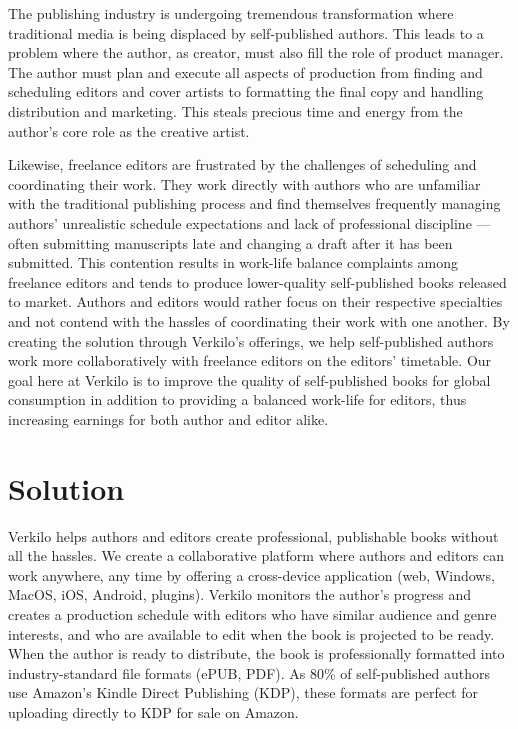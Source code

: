 \documentclass[10pt,openany]{book}
\begin{document}
The publishing industry is undergoing tremendous transformation where
traditional media is being displaced by self-published authors. This
leads to a problem where the author, as creator, must also fill the role
of product manager. The author must plan and execute all aspects of
production from finding and scheduling editors and cover artists to
formatting the final copy and handling distribution and marketing. This
steals precious time and energy from the author's core role as the
creative artist.

Likewise, freelance editors are frustrated by the challenges of
scheduling and coordinating their work. They work directly with authors
who are unfamiliar with the traditional publishing process and find
themselves frequently managing authors' unrealistic schedule
expectations and lack of professional discipline ---often submitting
manuscripts late and changing a draft after it has been submitted. This
contention results in work-life balance complaints among freelance
editors and tends to produce lower-quality self-published books released
to market. Authors and editors would rather focus on their respective
specialties and not contend with the hassles of coordinating their work
with one another. By creating the solution through Verkilo's offerings,
we help self-published authors work more collaboratively with freelance
editors on the editors' timetable. Our goal here at Verkilo is to
improve the quality of self-published books for global consumption in
addition to providing a balanced work-life for editors, thus increasing
earnings for both author and editor alike.

\hypertarget{solution}{%
\section{Solution}\label{solution}}

Verkilo helps authors and editors create professional, publishable books
without all the hassles. We create a collaborative platform where
authors and editors can work anywhere, any time by offering a
cross-device application (web, Windows, MacOS, iOS, Android, plugins).
Verkilo monitors the author's progress and creates a production schedule
with editors who have similar audience and genre interests, and who are
available to edit when the book is projected to be ready. When the
author is ready to distribute, the book is professionally formatted into
industry-standard file formats (ePUB, PDF). As 80\% of self-published
authors use Amazon's Kindle Direct Publishing (KDP), these formats are
perfect for uploading directly to KDP for sale on Amazon.
\end{document}

